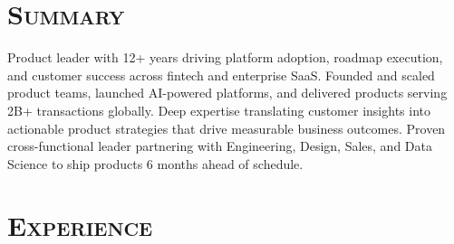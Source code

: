 \documentclass[11pt,a4paper]{moderncv}
\begin{document}
\makecvtitle
\vspace{-40pt}

\section{\textsc{Summary}}
\vspace{-5pt}
Product leader with 12+ years driving platform adoption, roadmap execution, and customer success across fintech and enterprise SaaS. Founded and scaled product teams, launched AI-powered platforms, and delivered products serving 2B+ transactions globally. Deep expertise translating customer insights into actionable product strategies that drive measurable business outcomes. Proven cross-functional leader partnering with Engineering, Design, Sales, and Data Science to ship products 6 months ahead of schedule.

\section{\textsc{Experience}}
\end{document}
